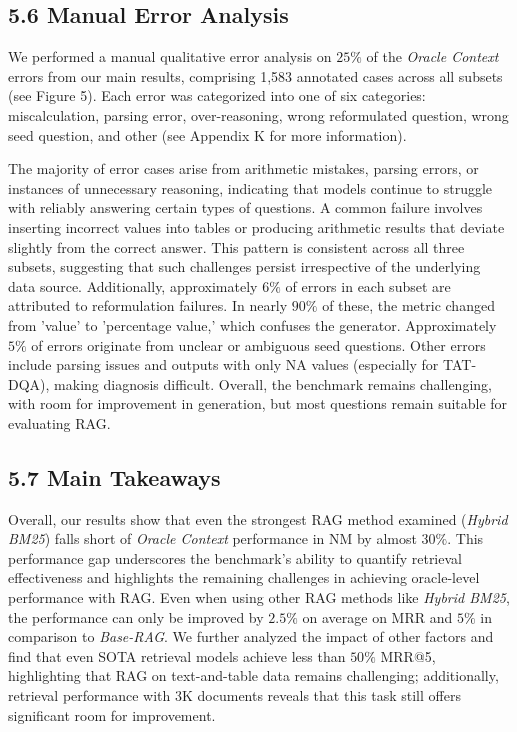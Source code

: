\documentclass[10pt]{article}
\begin{document}
\subsection*{5.6 Manual Error Analysis}
We performed a manual qualitative error analysis on $25\%$ of the \textit{Oracle Context} errors from our main results, comprising 1,583 annotated cases across all subsets (see Figure 5). Each error was categorized into one of six categories: miscalculation, parsing error, over-reasoning, wrong reformulated question, wrong seed question, and other (see Appendix K for more information).

The majority of error cases arise from arithmetic mistakes, parsing errors, or instances of unnecessary reasoning, indicating that models continue to struggle with reliably answering certain types of questions. A common failure involves inserting incorrect values into tables or producing arithmetic results that deviate slightly from the correct answer. This pattern is consistent across all three subsets, suggesting that such challenges persist irrespective of the underlying data source. Additionally, approximately $6\%$ of errors in each subset are attributed to reformulation failures. In nearly $90\%$ of these, the metric changed from 'value' to 'percentage value,' which confuses the generator. Approximately $5\%$ of errors originate from unclear or ambiguous seed questions. Other errors include parsing issues and outputs with only NA values (especially for TAT-DQA), making diagnosis difficult. Overall, the benchmark remains challenging, with room for improvement in generation, but most questions remain suitable for evaluating RAG.

\subsection*{5.7 Main Takeaways}
Overall, our results show that even the strongest RAG method examined (\textit{Hybrid BM25}) falls short of \textit{Oracle Context} performance in NM by almost $30\%$. This performance gap underscores the benchmark's ability to quantify retrieval effectiveness and highlights the remaining challenges in achieving oracle-level performance with RAG. Even when using other RAG methods like \textit{Hybrid BM25}, the performance can only be improved by $2.5\%$ on average on MRR and $5\%$ in comparison to \textit{Base-RAG}. We further analyzed the impact of other factors and find that even SOTA retrieval models achieve less than $50\%$ MRR@5, highlighting that RAG on text-and-table data remains challenging; additionally, retrieval performance with 3K documents reveals that this task still offers significant room for improvement.
\end{document}

